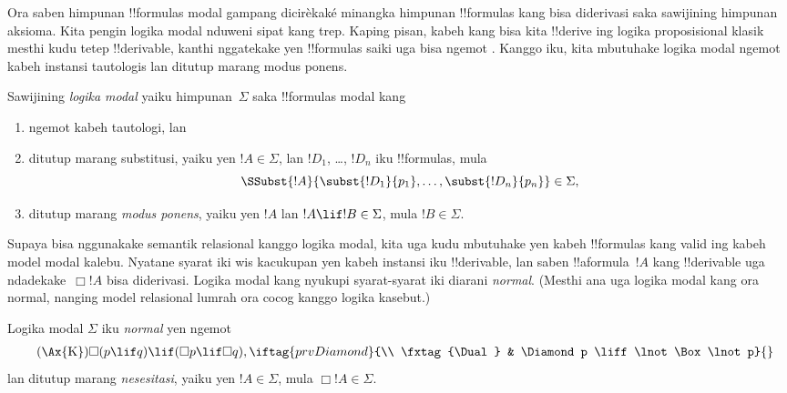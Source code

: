 \documentclass[../../../include/open-logic-section]{subfiles}
\begin{document}


Ora saben himpunan !!{formula}s modal gampang dicirèkaké
minangka himpunan !!{formula}s kang bisa diderivasi saka sawijining
himpunan aksioma. Kita pengin logika modal nduweni sipat kang trep.
Kaping pisan, kabeh kang bisa kita !!{derive} ing logika proposisional
klasik mesthi kudu tetep !!{derivable}, kanthi nggatekake yen
!!{formula}s saiki uga bisa ngemot
. Kanggo iku,
kita mbutuhake logika modal ngemot kabeh instansi tautologis lan
ditutup marang modus ponens.

\begin{defn}
  Sawijining \emph{logika modal} yaiku himpunan~$\Sigma$ saka
  !!{formula}s modal kang
  \begin{enumerate}
  \item ngemot kabeh tautologi, lan
  \item ditutup marang substitusi, yaiku yen $!A \in \Sigma$, lan
    $!D_1$, \dots, $!D_n$ iku !!{formula}s, mula
    \[
    \SSubst{!A}{\subst{!D_1}{p_1}, \dots, \subst{!D_n}{p_n}} \in \Sigma,
    \]
    \item ditutup marang \emph{modus ponens}, yaiku yen $!A$ lan $!A
      \lif !B \in \Sigma$, mula $!B \in \Sigma$.
  \end{enumerate}
\end{defn}

Supaya bisa nggunakake semantik relasional kanggo logika
modal, kita uga kudu mbutuhake yen kabeh !!{formula}s kang valid ing
kabeh model modal kalebu. Nyatane syarat iki wis kacukupan yen kabeh
instansi  iku
!!{derivable}, lan saben !!a{formula}~$!A$ kang !!{derivable} uga
ndadekake~$\Box !A$ bisa diderivasi. Logika modal kang nyukupi
syarat-syarat iki diarani \emph{normal}. (Mesthi ana uga logika modal
kang ora normal, nanging model relasional lumrah ora cocog kanggo
logika kasebut.)

\begin{defn}
  Logika modal $\Sigma$ iku \emph{normal} yen ngemot
  \begin{align*}
    \tag{\Ax{K}} & \Box(p \lif q) \lif (\Box p \lif \Box q),
    \iftag{prvDiamond}{\\
      \tag{\Dual} & \Diamond p \liff \lnot\Box\lnot p}{}
  \end{align*}
  lan ditutup marang \emph{nesesitasi}, yaiku yen $!A \in
  \Sigma$, mula $\Box !A \in \Sigma$.
\end{defn}
\end{document}
